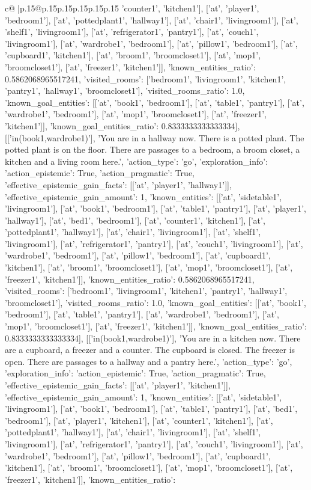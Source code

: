 \documentclass{article}
\begin{document}
{\begin{supertabular}{c@{$\;$}|p{.15\linewidth}@{}p{.15\linewidth}p{.15\linewidth}p{.15\linewidth}p{.15\linewidth}p{.15\linewidth}}
{{{'counter1', 'kitchen1'], ['at', 'player1', 'bedroom1'], ['at', 'pottedplant1', 'hallway1'], ['at', 'chair1', 'livingroom1'], ['at', 'shelf1', 'livingroom1'], ['at', 'refrigerator1', 'pantry1'], ['at', 'couch1', 'livingroom1'], ['at', 'wardrobe1', 'bedroom1'], ['at', 'pillow1', 'bedroom1'], ['at', 'cupboard1', 'kitchen1'], ['at', 'broom1', 'broomcloset1'], ['at', 'mop1', 'broomcloset1'], ['at', 'freezer1', 'kitchen1']], 'known_entities_ratio': 0.5862068965517241, 'visited_rooms': ['bedroom1', 'livingroom1', 'kitchen1', 'pantry1', 'hallway1', 'broomcloset1'], 'visited_rooms_ratio': 1.0, 'known_goal_entities': [['at', 'book1', 'bedroom1'], ['at', 'table1', 'pantry1'], ['at', 'wardrobe1', 'bedroom1'], ['at', 'mop1', 'broomcloset1'], ['at', 'freezer1', 'kitchen1']], 'known_goal_entities_ratio': 0.8333333333333334}}], [['in(book1,wardrobe1)'], 'You are in a hallway now. There is a potted plant. The potted plant is on the floor. There are passages to a bedroom, a broom closet, a kitchen and a living room here.', {'action_type': 'go', 'exploration_info': {'action_epistemic': True, 'action_pragmatic': True, 'effective_epistemic_gain_facts': [['at', 'player1', 'hallway1']], 'effective_epistemic_gain_amount': 1, 'known_entities': [['at', 'sidetable1', 'livingroom1'], ['at', 'book1', 'bedroom1'], ['at', 'table1', 'pantry1'], ['at', 'player1', 'hallway1'], ['at', 'bed1', 'bedroom1'], ['at', 'counter1', 'kitchen1'], ['at', 'pottedplant1', 'hallway1'], ['at', 'chair1', 'livingroom1'], ['at', 'shelf1', 'livingroom1'], ['at', 'refrigerator1', 'pantry1'], ['at', 'couch1', 'livingroom1'], ['at', 'wardrobe1', 'bedroom1'], ['at', 'pillow1', 'bedroom1'], ['at', 'cupboard1', 'kitchen1'], ['at', 'broom1', 'broomcloset1'], ['at', 'mop1', 'broomcloset1'], ['at', 'freezer1', 'kitchen1']], 'known_entities_ratio': 0.5862068965517241, 'visited_rooms': ['bedroom1', 'livingroom1', 'kitchen1', 'pantry1', 'hallway1', 'broomcloset1'], 'visited_rooms_ratio': 1.0, 'known_goal_entities': [['at', 'book1', 'bedroom1'], ['at', 'table1', 'pantry1'], ['at', 'wardrobe1', 'bedroom1'], ['at', 'mop1', 'broomcloset1'], ['at', 'freezer1', 'kitchen1']], 'known_goal_entities_ratio': 0.8333333333333334}}], [['in(book1,wardrobe1)'], 'You are in a kitchen now. There are a cupboard, a freezer and a counter. The cupboard is closed. The freezer is open. There are passages to a hallway and a pantry here.', {'action_type': 'go', 'exploration_info': {'action_epistemic': True, 'action_pragmatic': True, 'effective_epistemic_gain_facts': [['at', 'player1', 'kitchen1']], 'effective_epistemic_gain_amount': 1, 'known_entities': [['at', 'sidetable1', 'livingroom1'], ['at', 'book1', 'bedroom1'], ['at', 'table1', 'pantry1'], ['at', 'bed1', 'bedroom1'], ['at', 'player1', 'kitchen1'], ['at', 'counter1', 'kitchen1'], ['at', 'pottedplant1', 'hallway1'], ['at', 'chair1', 'livingroom1'], ['at', 'shelf1', 'livingroom1'], ['at', 'refrigerator1', 'pantry1'], ['at', 'couch1', 'livingroom1'], ['at', 'wardrobe1', 'bedroom1'], ['at', 'pillow1', 'bedroom1'], ['at', 'cupboard1', 'kitchen1'], ['at', 'broom1', 'broomcloset1'], ['at', 'mop1', 'broomcloset1'], ['at', 'freezer1', 'kitchen1']], 'known_entities_ratio': }}}
\end{supertabular}}
\end{document}
